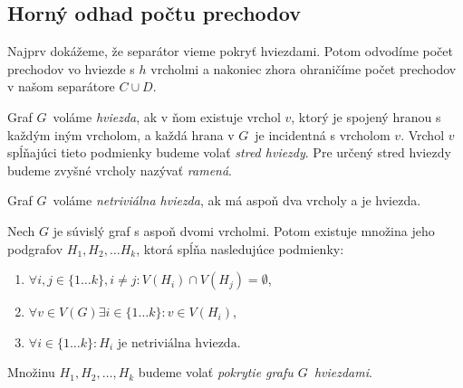 \subsection{Horný odhad počtu prechodov}

Najprv dokážeme, že separátor vieme pokryť hviezdami. Potom odvodíme počet prechodov vo hviezde
s $h$ vrcholmi a nakoniec zhora ohraničíme počet prechodov v našom separátore $C \cup D$.

\begin{defn}
    Graf $G$ voláme \emph{hviezda}, ak v ňom existuje vrchol $v$, ktorý je spojený hranou s každým iným
    vrcholom, a každá hrana v $G$ je incidentná s vrcholom $v$. Vrchol $v$ spĺňajúci tieto podmienky
    budeme volať \emph{stred hviezdy}. Pre určený stred hviezdy budeme zvyšné vrcholy nazývať \emph{ramená}.

    Graf $G$ voláme \emph{netriviálna hviezda}, ak má aspoň dva vrcholy a je hviezda.
\end{defn}

\begin{lema}
    Nech $G$ je súvislý graf s aspoň dvomi vrcholmi. Potom existuje množina jeho podgrafov
    $H_1, H_2, \ldots H_k$, ktorá spĺňa nasledujúce podmienky:
    \begin{enumerate}
        \item $\forall i, j \in \{1 \ldots k\}, i \neq j: V(H_i) \cap V(H_j) = \emptyset$,
        \item $\forall v \in V(G) \exists i \in \{1 \ldots k\}: v \in V(H_i)$,
        \item $\forall i \in \{1 \ldots k\}: H_i \textrm{ je netriviálna hviezda}$.
    \end{enumerate}

    Množinu $H_1, H_2, \ldots, H_k$ budeme volať \emph{pokrytie grafu $G$ hviezdami}.
\end{lema}

